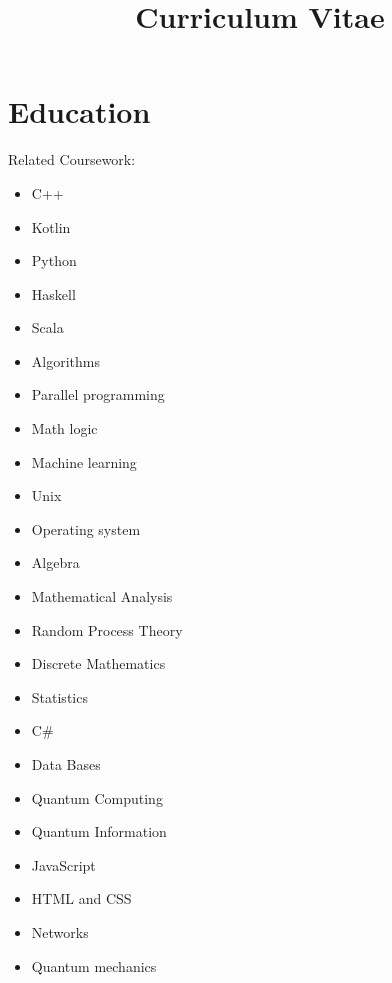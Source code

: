 \documentclass[11pt,a4paper,sans]{moderncv}        %
\title{Curriculum Vitae}
\begin{document}
	\vspace*{-1.05mm}
	\makecvtitle
	\vspace*{-10mm}
	
	\section{Education}
	{}{Related Coursework:}
	\vspace{-1.0em}\begin{small}
		\begin{multicols}{4}
			\begin{itemize}
				\item C++
				\item Kotlin
				\item Python
				\item Haskell
				\item Scala
				\item Algorithms
				\item Parallel programming
				\item Math logic
				\item Machine learning
				\item Unix
				\item Operating system
				\item Algebra
				\item Mathematical Analysis
				\item Random Process Theory
				\item Discrete Mathematics
				\item Statistics
				\item C\#
				\item Data Bases
				\item Quantum Computing
				\item Quantum Information
				\item JavaScript
				\item HTML and CSS
				\item Networks
				\item Quantum mechanics 
			\end{itemize}
	\end{multicols}\end{small}
	
\end{document}
